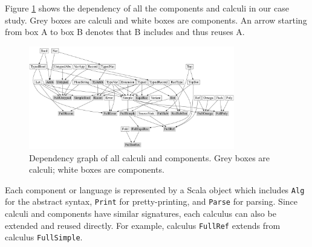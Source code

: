 

Figure \ref{fig:dependency} shows the
dependency of all the components and calculi in our case study. Grey
boxes are calculi and white boxes are components. An arrow starting
from box A to box B denotes that B includes and thus reuses A.

\begin{figure}
    \centering
    \includegraphics[width=0.8\textwidth]{resources/depGraph.pdf}
    \caption{Dependency graph of all calculi and components. Grey boxes are calculi; white boxes are components.}
    \label{fig:dependency}
\end{figure}

Each component or language is represented by a Scala object which includes \lstinline{Alg}
for the abstract syntax, \lstinline{Print} for pretty-printing, and \lstinline{Parse} for parsing.
Since calculi and components have similar signatures, each calculus
can also be extended and reused directly. For example, calculus \lstinline{FullRef} extends from
calculus \lstinline{FullSimple}.





